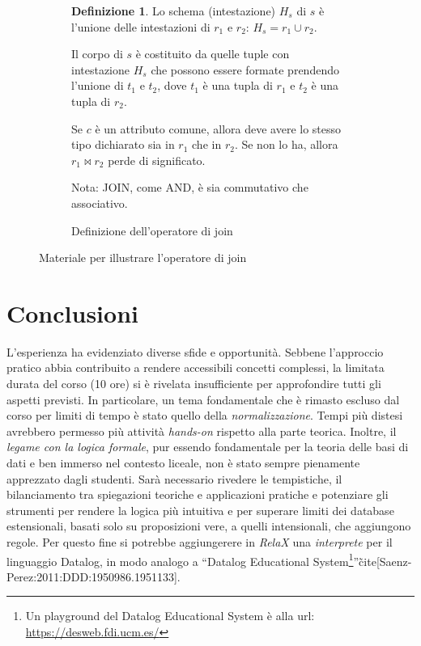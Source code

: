 \documentclass[withtimes]{easychair}
\theoremstyle{definition}
\newtheorem{definition}{Definizione}
\begin{document}
\begin{figure}[htp]
\begin{subfigure}[t]{\textwidth}
\begin{definition}
Lo schema (intestazione) $H_s$ di $s$ è l'unione delle intestazioni di $r_1$ e $r_2$: $H_s = r_1 \cup r_2$.

Il corpo di $s$ è costituito da quelle tuple con intestazione $H_s$ che possono essere formate prendendo l'unione di $t_1$ e $t_2$, dove $t_1$ è una tupla di $r_1$ e $t_2$ è una tupla di $r_2$.

Se $c$ è un attributo comune, allora deve avere lo stesso tipo dichiarato sia in $r_1$ che in $r_2$. Se non lo ha, allora $r_1 \bowtie r_2$ perde di significato.

Nota: JOIN, come AND, è sia commutativo che associativo.
		\end{definition}
		\caption{Definizione dell'operatore di join\label{fig:table-join}}
	\end{subfigure}

      \caption{Materiale per illustrare l'operatore di join}\label{fig:table-join}
\end{figure}

\section{Conclusioni}\label{conclusioni}

L'esperienza ha evidenziato diverse sfide e opportunità. Sebbene l'approccio pratico abbia contribuito a rendere accessibili concetti complessi, la limitata durata del corso (10 ore) si è rivelata insufficiente per approfondire tutti gli aspetti previsti. In particolare, un tema fondamentale che è rimasto escluso dal corso per limiti di tempo è stato quello della \emph{normalizzazione}. Tempi più distesi avrebbero permesso più attività \emph{hands-on} rispetto alla parte teorica. Inoltre, il \emph{legame con la logica formale}, pur essendo fondamentale per la teoria delle basi di dati e ben immerso nel contesto liceale, non è stato sempre pienamente apprezzato dagli studenti. Sarà necessario rivedere le tempistiche, il bilanciamento tra spiegazioni teoriche e applicazioni pratiche e potenziare gli strumenti per rendere la logica più intuitiva e per superare  limiti dei database estensionali, basati solo su proposizioni vere, a quelli intensionali, che aggiungono regole. Per questo fine si potrebbe aggiungerere in \emph{RelaX} una \emph{interprete} per il linguaggio Datalog, in modo analogo a ``Datalog Educational System\footnote{Un playground del Datalog Educational System è alla url: \url{https://desweb.fdi.ucm.es/}}''\~cite[Saenz-Perez:2011:DDD:1950986.1951133].

\label{sect:bib}
\printbibliography
\end{document}
